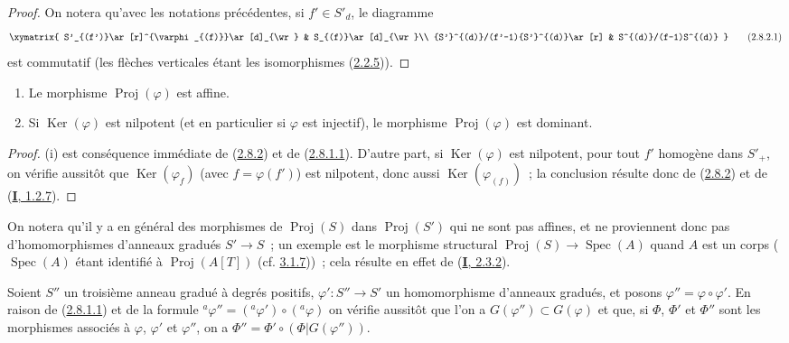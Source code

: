 \begin{proof}
On notera qu'avec les notations précédentes, si $f'\in S'_d$, le diagramme
\[
\label{II.2.8.2.1-fr}
  \xymatrix{
    S'_{(f')}\ar[r]^{\varphi_{(f)}}\ar[d]_{\wr}
    & S_{(f)}\ar[d]_{\wr}\\
    {S'}^{(d)}/(f'-1){S'}^{(d)}\ar[r]
    & S^{(d)}/(f-1)S^{(d)}
  }
\tag{2.8.2.1}
\]
est commutatif (les flèches verticales étant les isomorphismes
(\hyperref[II.2.2.5-fr]{2.2.5})).
\end{proof}

\begin{corollary}[2.8.3]
\label{II.2.8.3-fr}
\begin{enumerate}
  \item[\rm(i)] Le morphisme $\operatorname{Proj}(\varphi)$ est affine.
  \item[\rm(ii)] Si $\operatorname{Ker}(\varphi)$ est nilpotent (et en
    particulier si $\varphi$ est injectif), le morphisme
    $\operatorname{Proj}(\varphi)$ est dominant.
\end{enumerate}
\end{corollary}

\begin{proof}
(i) est conséquence immédiate de (\hyperref[II.2.8.2-fr]{2.8.2}) et de
(\hyperref[II.2.8.1.1-fr]{2.8.1.1}). D'autre part, si
$\operatorname{Ker}(\varphi)$ est nilpotent, pour tout $f'$ homogène dans
$S'_+$, on vérifie aussitôt que $\operatorname{Ker}(\varphi_f)$ (avec
$f=\varphi(f')$) est nilpotent, donc aussi
$\operatorname{Ker}(\varphi_{(f)})$~; la conclusion résulte donc de
(\hyperref[II.2.8.2-fr]{2.8.2}) et de
(\hyperref[I.1.2.7-fr]{\textbf{I}, 1.2.7}).
\end{proof}

On notera qu'il y a en général des morphismes de $\operatorname{Proj}(S)$
dans $\operatorname{Proj}(S')$ qui ne sont pas affines, et ne proviennent
donc pas d'homomorphismes d'anneaux gradués $S'\to S$~; un exemple est le
morphisme structural $\operatorname{Proj}(S)\to\operatorname{Spec}(A)$ quand
$A$ est un corps ($\operatorname{Spec}(A)$ étant identifié à
$\operatorname{Proj}(A[T])$ (cf. \hyperref[II.3.1.7-fr]{3.1.7}))~; cela
résulte en effet de (\hyperref[I.2.3.2-fr]{\textbf{I}, 2.3.2}).

\begin{env}[2.8.4]
\label{II.2.8.4-fr}
Soient $S''$ un troisième anneau gradué à degrés positifs,
$\varphi':S''\to S'$ un homomorphisme d'anneaux gradués, et posons
$\varphi''=\varphi\circ\varphi'$. En raison de
(\hyperref[II.2.8.1.1-fr]{2.8.1.1}) et de la formule
${}^a\varphi''=({}^a\varphi')\circ({}^a\varphi)$ on vérifie aussitôt que l'on
a $G(\varphi'')\subset G(\varphi)$ et que, si $\Phi$, $\Phi'$ et $\Phi''$
sont les morphismes associés à $\varphi$, $\varphi'$ et $\varphi''$, on a
$\Phi''=\Phi'\circ(\Phi|G(\varphi''))$.
\end{env}

